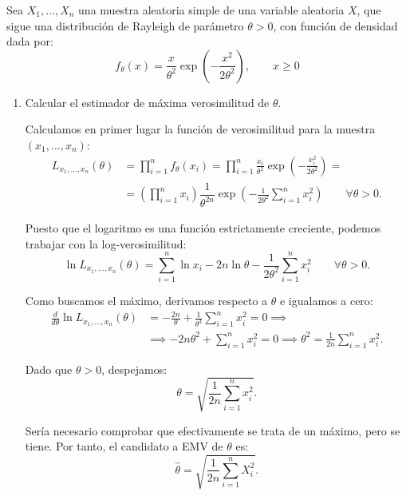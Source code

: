 \begin{ejercicio}
    Sea $X_1, \ldots, X_n$ una muestra aleatoria simple de una variable aleatoria $X$, que sigue una distribución de Rayleigh de parámetro $\theta > 0$, con función de densidad dada por:
    \begin{equation*}
        f_\theta(x) = \frac{x}{\theta^2} \exp\left(-\frac{x^2}{2\theta^2}\right), \qquad x \geq 0
    \end{equation*}
    \begin{enumerate}[label=\alph*)]
        \item Calcular el estimador de máxima verosimilitud de $\theta$.
        
        Calculamos en primer lugar la función de verosimilitud para la muestra $(x_1, \ldots, x_n)$:
        \begin{align*}
            L_{x_1, \ldots, x_n}(\theta) &= \prod_{i=1}^{n} f_\theta(x_i) = \prod_{i=1}^{n} \frac{x_i}{\theta^2} \exp\left(-\frac{x_i^2}{2\theta^2}\right) = \\
            &= \left(\prod_{i=1}^{n} x_i\right) \dfrac{1}{\theta^{2n}} \exp\left(-\frac{1}{2\theta^2}\sum_{i=1}^{n} x_i^2\right) \qquad \forall \theta > 0.
        \end{align*}

        Puesto que el logaritmo es una función estrictamente creciente, podemos trabajar con la log-verosimilitud:
        \begin{equation*}
            \ln L_{x_1, \ldots, x_n}(\theta) = \sum_{i=1}^{n} \ln x_i - 2n \ln \theta - \frac{1}{2\theta^2} \sum_{i=1}^{n} x_i^2 \qquad \forall \theta > 0.
        \end{equation*}

        Como buscamos el máximo, derivamos respecto a $\theta$ e igualamos a cero:
        \begin{align*}
            \frac{d}{d\theta}\ln L_{x_1, \ldots, x_n}(\theta) &= -\frac{2n}{\theta} + \frac{1}{\theta^3}\sum_{i=1}^{n} x_i^2 = 0 \implies \\
            &\implies -2n\theta^2 + \sum_{i=1}^{n} x_i^2 = 0 \implies \theta^2 = \frac{1}{2n}\sum_{i=1}^{n} x_i^2.
        \end{align*}

        Dado que $\theta > 0$, despejamos:
        \begin{equation*}
            \theta = \sqrt{\frac{1}{2n}\sum_{i=1}^{n} x_i^2}.
        \end{equation*}

        Sería necesario comprobar que efectivamente se trata de un máximo, pero se tiene. Por tanto, el candidato a EMV de $\theta$ es:
        \begin{equation*}
            \widehat{\theta} = \sqrt{\frac{1}{2n}\sum_{i=1}^{n} X_i^2}.
        \end{equation*}


\end{enumerate}
\end{ejercicio}

